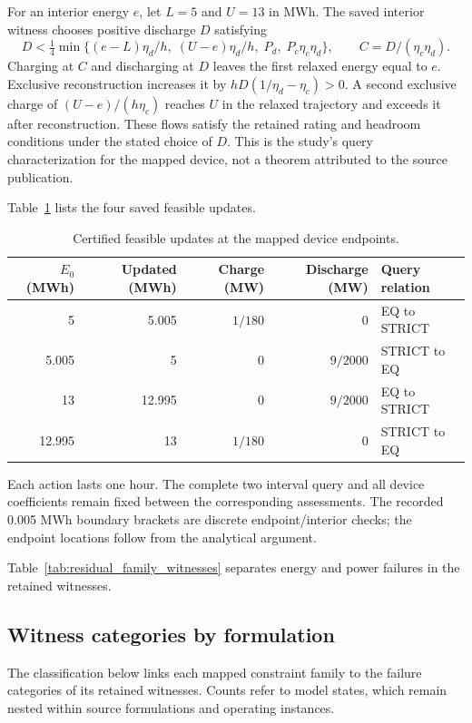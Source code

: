 For an interior energy $e$, let $L=5$ and $U=13$ in MWh. The saved
interior witness chooses positive discharge $D$ satisfying
\begin{equation}
D<\tfrac 14\min\{(e-L)\eta_d/h,\;(U-e)\eta_d/h,\;
P_d,\;P_c\eta_c\eta_d\},\qquad C=D/(\eta_c\eta_d).
\label{eq:elgersma_interior}
\end{equation}
Charging at $C$ and discharging at $D$ leaves the first relaxed energy
equal to $e$. Exclusive reconstruction increases it by
$hD(1/\eta_d-\eta_c)>0$. A second exclusive charge of
$(U-e)/(h\eta_c)$ reaches $U$ in the relaxed trajectory and exceeds it
after reconstruction. These flows satisfy the retained rating and
headroom conditions under the stated choice of $D$. This is the study's
query characterization for the mapped device, not a theorem attributed
to the source publication.

Table~\ref{tab:external_transitions} lists the four saved feasible updates.

\begin{table}[htbp]
\caption{Certified feasible updates at the mapped device endpoints.}\label{tab:external_transitions}
\begin{tabular}{@{}rrrrl@{}}\toprule
$E_0$ (MWh)&Updated (MWh)&Charge (MW)&Discharge (MW)&Query relation\\\midrule
5&5.005&$1/180$&0&EQ to STRICT\\
5.005&5&0&$9/2000$&STRICT to EQ\\
13&12.995&0&$9/2000$&EQ to STRICT\\
12.995&13&$1/180$&0&STRICT to EQ\\
\bottomrule\end{tabular}
\end{table}

Each action lasts one hour. The complete two interval query and all device
coefficients remain fixed between the corresponding assessments.
The recorded 0.005 MWh boundary brackets are discrete endpoint/interior
checks; the endpoint locations follow from the analytical argument.

Table~\ref{tab:residual_family_witnesses} separates energy and power failures in the retained witnesses.
\subsection{Witness categories by formulation}
The classification below links each mapped constraint family to the
failure categories of its retained witnesses. Counts refer to model states,
which remain nested within source formulations and operating instances.

